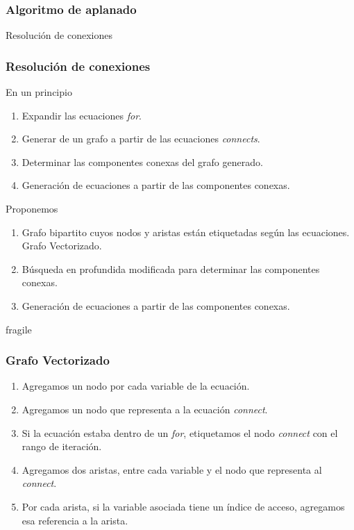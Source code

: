 \begin{frame}[fragile]
\frametitle{Algoritmo de aplanado} 
\begin{center}
\huge Resolución de conexiones
\end{center}
\end{frame}

\begin{frame}[fragile]
\frametitle{Resolución de conexiones} 
\begin{block}{En un principio}
\begin{enumerate}
\item Expandir las ecuaciones \textit{for}.
\item Generar de un grafo a partir de las ecuaciones \textit{connects}.
\item Determinar las componentes conexas del grafo generado.
\item Generación de ecuaciones a partir de las componentes conexas.
\end{enumerate}
\end{block}

\pause
\begin{block}{Proponemos}
\begin{enumerate}
\item Grafo bipartito cuyos nodos y aristas están etiquetadas según las ecuaciones. \\Grafo Vectorizado.
\item Búsqueda en profundida modificada para determinar las componentes conexas.    
\item Generación de ecuaciones a partir de las componentes conexas.
\end{enumerate}
\end{block}

\end{frame}

\begin{frame}{fragile}
\frametitle{Grafo Vectorizado}
\begin{enumerate}
\setlength\itemsep{1em}
\item Agregamos un nodo por cada variable de la ecuación.
\item Agregamos un nodo que representa a la ecuación \textit{connect}.
\item Si la ecuación estaba dentro de un \textit{for}, etiquetamos el nodo \textit{connect} con el rango de iteraci\'on. 
\item Agregamos dos aristas, entre cada variable y el nodo que representa al \textit{connect}.
\item Por cada arista, si la variable asociada tiene un índice de acceso, agregamos esa referencia a la arista. 
\end{enumerate}
\end{frame}

